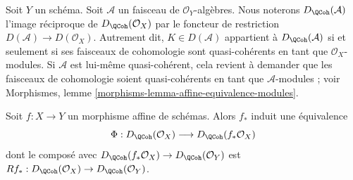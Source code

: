 \noindent
Soit $Y$ un schéma. Soit $\mathcal{A}$ un faisceau de $\mathcal{O}_Y$-algèbres.
Nous noterons $D_\QCoh(\mathcal{A})$ l'image réciproque de
$D_\QCoh(\mathcal{O}_X)$ par le foncteur de restriction
$D(\mathcal{A}) \to D(\mathcal{O}_X)$. Autrement dit, $K \in D(\mathcal{A})$
appartient à $D_\QCoh(\mathcal{A})$ si et seulement si ses faisceaux de cohomologie sont
quasi-cohérents en tant que $\mathcal{O}_X$-modules. Si $\mathcal{A}$ est lui-même quasi-cohérent,
cela revient à demander que les faisceaux de cohomologie soient quasi-cohérents
en tant que $\mathcal{A}$-modules ; voir
Morphismes, lemme \ref{morphisms-lemma-affine-equivalence-modules}.

\begin{lemma}
\label{lemma-affine-morphism-equivalence}
Soit $f : X \to Y$ un morphisme affine de schémas. Alors $f_*$ induit
une équivalence
$$
\Phi : D_\QCoh(\mathcal{O}_X) \longrightarrow D_\QCoh(f_*\mathcal{O}_X)
$$
dont le composé avec $D_\QCoh(f_*\mathcal{O}_X) \to D_\QCoh(\mathcal{O}_Y)$
est $Rf_* : D_\QCoh(\mathcal{O}_X) \to D_\QCoh(\mathcal{O}_Y)$.
\end{lemma}

